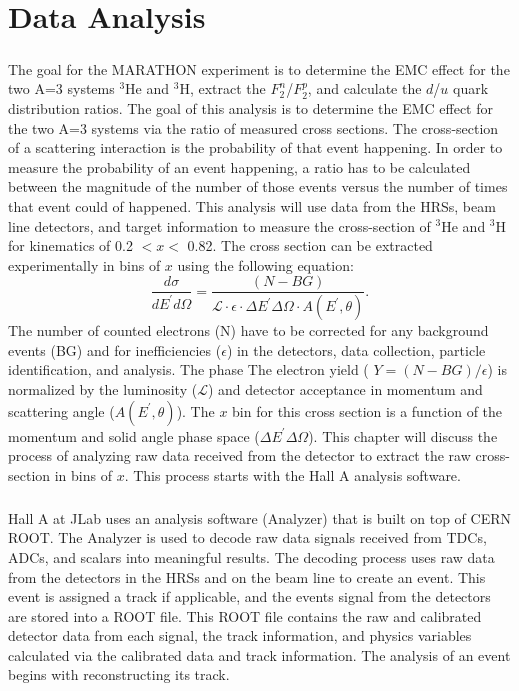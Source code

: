 	\chapter{Data Analysis}
\paragraph{}The goal for the MARATHON experiment is to determine the EMC effect for the two A=3 systems $^3$He and $^3$H, extract the  $F_2^n$/$F_2^p$, and calculate the $d$/$u$ quark distribution ratios. The goal of this analysis is to determine the EMC effect for the two A=3 systems via the ratio of measured cross sections. The cross-section of a scattering interaction is the probability of that event happening. In order to measure the probability of an event happening, a ratio has to be calculated between the magnitude of the number of those events versus the number of times that event could of happened. This analysis will use data from the HRSs, beam line detectors, and target information to measure the cross-section of $^3$He and $^3$H for kinematics of 0.2 $< x <$ 0.82. The cross section can be extracted experimentally in bins of $x$ using the following equation:
\begin{equation}
\dfrac{d\sigma}{dE^{\prime}d\Omega} = \frac{(N - BG)}{\mathscr{L} \cdot \epsilon \cdot \Delta E^{\prime} \Delta \Omega \cdot A(E^{\prime},\theta)}. \label{expcc}
\end{equation}
The number of counted electrons (N) have to be corrected for any background events (BG) and for inefficiencies ($\epsilon$) in the detectors, data collection, particle identification, and analysis. The phase  The electron yield ( $Y=(N-BG)/\epsilon$) is normalized by the luminosity ($\mathscr{L}$) and detector acceptance in momentum and scattering angle ($A(E^{\prime},\theta)$). The $x$ bin for this cross section is a function of the momentum and solid angle phase space ($\Delta E^{\prime} \Delta \Omega$). This chapter will discuss the process of analyzing raw data received from the detector to extract the raw cross-section in bins of $x$. This process starts with the Hall A analysis software.  
\paragraph{}Hall A at JLab uses an analysis software (Analyzer) that is built on top of CERN ROOT. The Analyzer is used to decode raw data signals received from TDCs, ADCs, and scalars into meaningful results. The decoding process uses raw data from the detectors in the HRSs and on the beam line to create an event. This event is assigned a track if applicable, and the events signal from the detectors are stored into a ROOT file. This ROOT file contains the raw and calibrated detector data from each signal, the track information, and physics variables calculated via the calibrated data and track information. The analysis of an event begins with reconstructing its track. 
